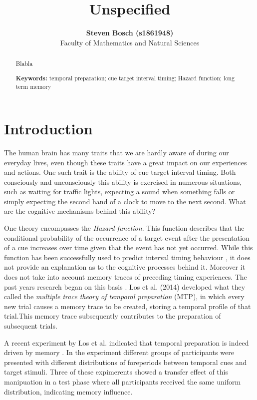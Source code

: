 \documentclass[10pt,letterpaper]{article}
\title{Unspecified}
\author{{\large \bf Steven Bosch (s1861948)} \\
  Faculty of Mathematics and Natural Sciences}
\begin{document}
\maketitle

\begin{abstract}
Blabla

\textbf{Keywords:} 
temporal preparation; cue target interval timing; Hazard function; long term memory
\end{abstract}

\section{Introduction}
The human brain has many traits that we are hardly aware of during our everyday lives, even though these traits have a great impact on our experiences and actions. One such trait is the ability of cue target interval timing. Both consciously and unconsciously this ability is exercised in numerous situations, such as waiting for traffic lights, expecting a sound when something falls or simply expecting the second hand of a clock to move to the next second. What are the cognitive mechanisms behind this ability?

One theory encompasses the \textit{Hazard function}. This function describes that the conditional probability of the occurrence of a target event after the presentation of a cue increases over time given that the event has not yet occurred. While this function has been successfully used to predict interval timing behaviour \cite{Nobre, Vangkilde}, it does not provide an explanation as to the cognitive processes behind it. Moreover it does not take into account memory traces of preceding timing experiences. The past years research began on this basis \cite{Los1, Howard, Taatgen}. Los et al. (2014) developed what they called the \textit{multiple trace theory of temporal preparation} (MTP), in which every new trial causes a memory trace to be created, storing a temporal profile of that trial.This memory trace subsequently contributes to the preparation of subsequent trials. 

A recent experiment by Los et al. indicated that temporal preparation is indeed driven by memory \cite{Los2}. In the experiment different groups of participants were presented with different distributions of foreperiods between temporal cues and target stimuli. Three of these expimerents showed a transfer effect of this manipuation in a test phase where all participants received the same uniform distribution, indicating memory influence. 
\end{document}
